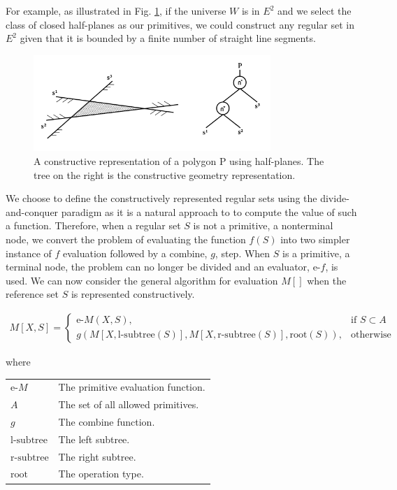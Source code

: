 \documentclass[a4paper,11pt,oneside]{article}
\makeatletter
\newenvironment{conditions}
  {\par\vspace{\abovedisplayskip}\noindent\begin{tabular}{>{$}l<{$} @{${}={}$} l}}
  {\end{tabular}\par\vspace{\belowdisplayskip}}
\makeatother
\begin{document}
For example, as illustrated in Fig. \ref{sect3:halfplane-csg}, if the universe $W$ is in $E^2$ and we select the class of closed half-planes as our primitives, we could construct any regular set in $E^2$ given that it is bounded by a finite number of straight line segments.

\begin{figure}[ht]
	\begin{center}
		\includegraphics[width=0.8\textwidth]{section3/3.2/halfplane-csg.png}
	\end{center}
	\caption{A constructive representation of a polygon P using half-planes. The tree on the right is the constructive geometry representation.}
	\label{sect3:halfplane-csg}
\end{figure}

We choose to define the constructively represented regular sets using the divide-and-conquer paradigm as it is a natural approach to to compute the value of such a function. Therefore, when a regular set $S$ is not a primitive, a nonterminal node, we convert the problem of evaluating the function $f(S)$ into two simpler instance of $f$ evaluation followed by a combine, $g$, step. When $S$ is a primitive, a terminal node, the problem can no longer be divided and an evaluator, e-$f$, is used. We can now consider the general algorithm for evaluation $M[]$ when the reference set $S$ is represented constructively.

\begin{align}
	M[X,S]= 
	\begin{cases}
	\text{e-}M(X, S),                                                        & \text{if } S \subset A \\
	g(M[X, \text{l-subtree}(S)], M[X, \text{r-subtree}(S)], \text{root}(S)), & \text{otherwise}       
	\end{cases}
\end{align}

where

\begin{conditions}
	\text{e-}M     	  &  The primitive evaluation function. \\
	A     			  	  &  The set of all allowed primitives. \\
	g     				  &  The combine function. \\
	\text{l-subtree}     &  The left subtree. \\
	\text{r-subtree}     &  The right subtree. \\
	\text{root}     	  &  The operation type. \footnotemark \\
\end{conditions}
\end{document}
